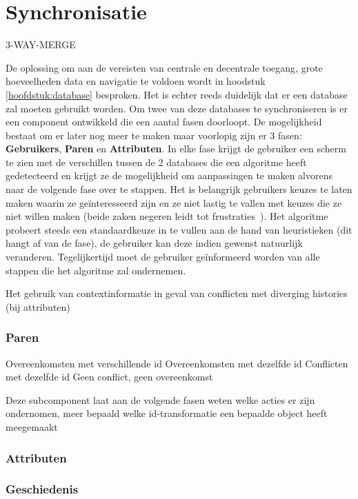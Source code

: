 \chapter{Synchronisatie}
\label{hoofdstuk:synchronisatie}

3-WAY-MERGE

De oplossing om aan de vereisten van centrale en decentrale toegang, grote hoeveelheden data en navigatie te voldoen wordt in hoodstuk \ref{hoofdstuk:database} besproken. Het is echter reeds duidelijk dat er een database zal moeten gebruikt worden. Om twee van deze databases te synchroniseren is er een component ontwikkeld die een aantal fasen doorloopt. De mogelijkheid bestaat om er later nog meer te maken maar voorlopig zijn er 3 fasen: \textbf{Gebruikers}, \textbf{Paren} en \textbf{Attributen}. In elke fase krijgt de gebruiker een scherm te zien met de verschillen tussen de 2 databases die een algoritme heeft gedetecteerd en krijgt ze de mogelijkheid om aanpassingen te maken alvorens naar de volgende fase over te stappen. Het is belangrijk gebruikers keuzes te laten maken waarin ze ge\"interesseerd zijn en ze niet lastig te vallen met keuzes die ze niet willen maken (beide zaken negeren leidt tot frustraties~\cite{Joel2001}). Het algoritme probeert steeds een standaardkeuze in te vullen aan de hand van heuristieken (dit hangt af van de fase), de gebruiker kan deze indien gewenst natuurlijk veranderen. Tegelijkertijd moet de gebruiker ge\"informeerd worden van alle stappen die het algoritme zal ondernemen. 

Het gebruik van contextinformatie in geval van conflicten met diverging histories (bij attributen)

\subsection{Paren}

Overeenkomsten met verschillende id
Overeenkomsten met dezelfde id
Conflicten met dezelfde id
Geen conflict, geen overeenkomst

Deze subcomponent laat aan de volgende fasen weten welke acties er zijn ondernomen, meer bepaald welke id-transformatie een bepaalde object heeft meegemaakt

\subsection{Attributen}
\subsection{Geschiedenis}